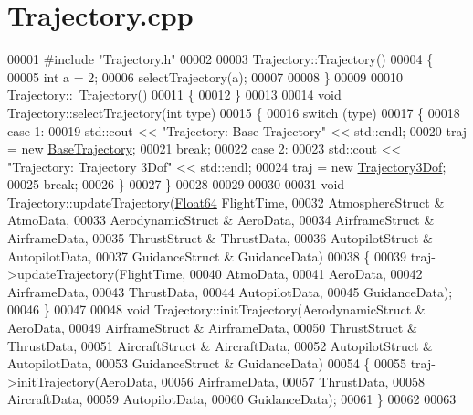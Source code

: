 \hypertarget{_trajectory_8cpp_source}{}\section{Trajectory.\+cpp}
\label{_trajectory_8cpp_source}

\begin{DoxyCode}
00001 \textcolor{preprocessor}{#include "Trajectory.h"}
00002 
00003 Trajectory::Trajectory()
00004 \{
00005     \textcolor{keywordtype}{int} a = 2;
00006     selectTrajectory(a);
00007 
00008 \}
00009 
00010 Trajectory::~Trajectory()
00011 \{
00012 \}
00013 
00014 \textcolor{keywordtype}{void} Trajectory::selectTrajectory(\textcolor{keywordtype}{int} type)
00015 \{
00016     \textcolor{keywordflow}{switch} (type)
00017     \{
00018     \textcolor{keywordflow}{case} 1:
00019         std::cout << \textcolor{stringliteral}{"Trajectory: Base Trajectory"} << std::endl;
00020         traj = \textcolor{keyword}{new} \hyperlink{group___trajectory_class_base_trajectory}{BaseTrajectory};
00021         \textcolor{keywordflow}{break};
00022     \textcolor{keywordflow}{case} 2:
00023         std::cout << \textcolor{stringliteral}{"Trajectory: Trajectory 3Dof"} << std::endl;
00024         traj = \textcolor{keyword}{new} \hyperlink{group___trajectory_class_trajectory3_dof}{Trajectory3Dof};
00025         \textcolor{keywordflow}{break};
00026     \}
00027 \}
00028 
00029 
00030 
00031 \textcolor{keywordtype}{void} Trajectory::updateTrajectory(\hyperlink{group___tools_ga3f1431cb9f76da10f59246d1d743dc2c}{Float64} FlightTime, 
00032                                   AtmosphereStruct & AtmoData, 
00033                                   AerodynamicStruct & AeroData, 
00034                                   AirframeStruct & AirframeData, 
00035                                   ThrustStruct & ThrustData, 
00036                                   AutopilotStruct & AutopilotData,
00037                                   GuidanceStruct & GuidanceData)
00038 \{
00039     traj->updateTrajectory(FlightTime,
00040                            AtmoData,
00041                            AeroData, 
00042                            AirframeData, 
00043                            ThrustData,
00044                             AutopilotData,
00045                             GuidanceData);
00046 \}
00047 
00048 \textcolor{keywordtype}{void} Trajectory::initTrajectory(AerodynamicStruct & AeroData, 
00049                                 AirframeStruct & AirframeData, 
00050                                 ThrustStruct & ThrustData, 
00051                                 AircraftStruct & AircraftData, 
00052                                 AutopilotStruct & AutopilotData, 
00053                                 GuidanceStruct & GuidanceData)
00054 \{
00055     traj->initTrajectory(AeroData,
00056                         AirframeData,
00057                         ThrustData,
00058                         AircraftData,
00059                         AutopilotData,
00060                         GuidanceData);
00061 \}
00062 
00063 
\end{DoxyCode}
